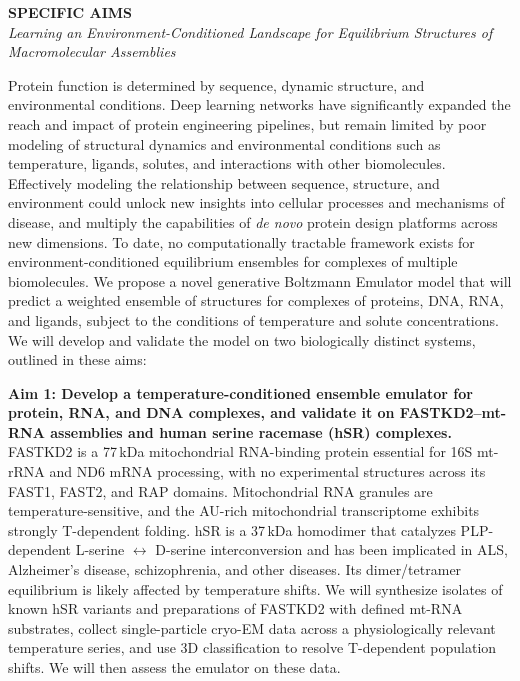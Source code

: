 \documentclass[11pt]{article}
\begin{document}
\begin{center}
{\large\bfseries SPECIFIC AIMS}\\[2pt]
{\small\itshape Learning an Environment-Conditioned Landscape for Equilibrium Structures of Macromolecular Assemblies}
\end{center}

Protein function is determined by sequence, dynamic structure, and environmental conditions. Deep learning networks have significantly expanded the reach and impact of protein engineering pipelines, but remain limited by poor modeling of structural dynamics and environmental conditions such as temperature, ligands, solutes, and interactions with other biomolecules. Effectively modeling the relationship between sequence, structure, and environment could unlock new insights into cellular processes and mechanisms of disease, and multiply the capabilities of \textit{de novo} protein design platforms across new dimensions. To date, no computationally tractable framework exists for environment-conditioned equilibrium ensembles for complexes of multiple biomolecules. We propose a novel generative Boltzmann Emulator model that will predict a weighted ensemble of structures for complexes of proteins, DNA, RNA, and ligands, subject to the conditions of temperature and solute concentrations. We will develop and validate the model on two biologically distinct systems, outlined in these aims:

\textbf{Aim 1: Develop a temperature-conditioned ensemble emulator for protein, RNA, and DNA complexes, and validate it on FASTKD2--mt-RNA assemblies and human serine racemase (hSR) complexes.}
FASTKD2 is a 77\,kDa mitochondrial RNA-binding protein essential for 16S mt-rRNA and ND6 mRNA processing, with no experimental structures across its FAST1, FAST2, and RAP domains. Mitochondrial RNA granules are temperature-sensitive, and the AU-rich mitochondrial transcriptome exhibits strongly T-dependent folding. hSR is a 37\,kDa homodimer that catalyzes PLP-dependent L-serine $\leftrightarrow$ D-serine interconversion and has been implicated in ALS, Alzheimer's disease, schizophrenia, and other diseases. Its dimer/tetramer equilibrium is likely affected by temperature shifts.
We will synthesize isolates of known hSR variants and preparations of FASTKD2 with defined mt-RNA substrates, collect single-particle cryo-EM data across a physiologically relevant temperature series, and use 3D classification to resolve T-dependent population shifts. We will then assess the emulator on these data.
\end{document}
